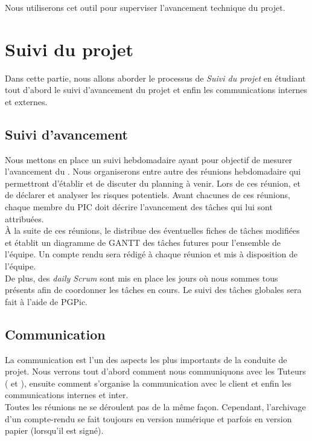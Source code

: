 Nous utiliserons cet outil pour superviser l'avancement technique du projet.

\section{Suivi du projet} 
\label{suivi_projet}

Dans cette partie, nous allons aborder le processus de \textit{Suivi du projet} en étudiant tout d'abord le suivi d'avancement du projet et enfin les communications internes et externes.  

\subsection{Suivi d'avancement}
\label{suivi_avancement}

Nous mettons en place un suivi hebdomadaire ayant pour objectif de mesurer l'avancement du \PICCourt. Nous organiserons entre autre des réunions hebdomadaire qui permettront d'établir et de discuter du planning à venir. Lors de ces réunion,  et de déclarer et analyser les risques potentiels. Avant chacunes de ces réunions, chaque membre du PIC doit décrire l'avancement des tâches qui lui sont attribuées.\\

À la suite de ces réunions, le \CP{} distribue des éventuelles fiches de tâches modifiées et établit un diagramme de GANTT des tâches futures pour l'ensemble de l'équipe. Un compte rendu sera rédigé à chaque réunion et mis à disposition de l'équipe. \\

De plus, des \textit{daily Scrum} sont mis en place les jours où nous sommes tous présents afin de coordonner les tâches en cours. Le suivi des tâches globales sera fait à l’aide de PGPic.

\subsection{Communication}
\label{communication}

La communication est l'un des aspects les plus importants de la conduite de projet. Nous verrons tout d'abord comment nous communiquons avec les Tuteurs (\tuteurPedagogique{} et \tuteurQualite), ensuite comment s'organise la communication avec le client et enfin les communications internes et inter\PICCourt.\\ 

Toutes les réunions ne se déroulent pas de la même façon. Cependant, l’archivage d’un compte-rendu se fait toujours en version numérique et parfois en version papier (lorsqu’il est signé).

